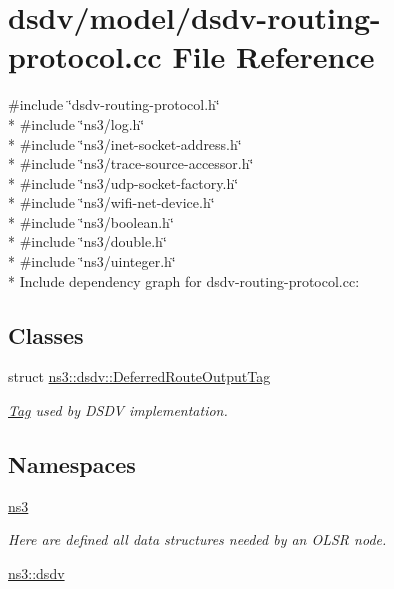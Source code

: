 \hypertarget{dsdv-routing-protocol_8cc}{}\section{dsdv/model/dsdv-\/routing-\/protocol.cc File Reference}
\label{dsdv-routing-protocol_8cc}
{\ttfamily \#include \char`\"{}dsdv-\/routing-\/protocol.\+h\char`\"{}}\\*
{\ttfamily \#include \char`\"{}ns3/log.\+h\char`\"{}}\\*
{\ttfamily \#include \char`\"{}ns3/inet-\/socket-\/address.\+h\char`\"{}}\\*
{\ttfamily \#include \char`\"{}ns3/trace-\/source-\/accessor.\+h\char`\"{}}\\*
{\ttfamily \#include \char`\"{}ns3/udp-\/socket-\/factory.\+h\char`\"{}}\\*
{\ttfamily \#include \char`\"{}ns3/wifi-\/net-\/device.\+h\char`\"{}}\\*
{\ttfamily \#include \char`\"{}ns3/boolean.\+h\char`\"{}}\\*
{\ttfamily \#include \char`\"{}ns3/double.\+h\char`\"{}}\\*
{\ttfamily \#include \char`\"{}ns3/uinteger.\+h\char`\"{}}\\*
Include dependency graph for dsdv-\/routing-\/protocol.cc\+:
\subsection*{Classes}
\begin{DoxyCompactItemize}
\item 
struct \hyperlink{structns3_1_1dsdv_1_1DeferredRouteOutputTag}{ns3\+::dsdv\+::\+Deferred\+Route\+Output\+Tag}
\begin{DoxyCompactList}\small\item\em \hyperlink{classns3_1_1Tag}{Tag} used by D\+S\+DV implementation. \end{DoxyCompactList}\end{DoxyCompactItemize}
\subsection*{Namespaces}
\begin{DoxyCompactItemize}
\item 
 \hyperlink{namespacens3}{ns3}
\begin{DoxyCompactList}\small\item\em Here are defined all data structures needed by an O\+L\+SR node. \end{DoxyCompactList}\item 
 \hyperlink{namespacens3_1_1dsdv}{ns3\+::dsdv}
\end{DoxyCompactItemize}
